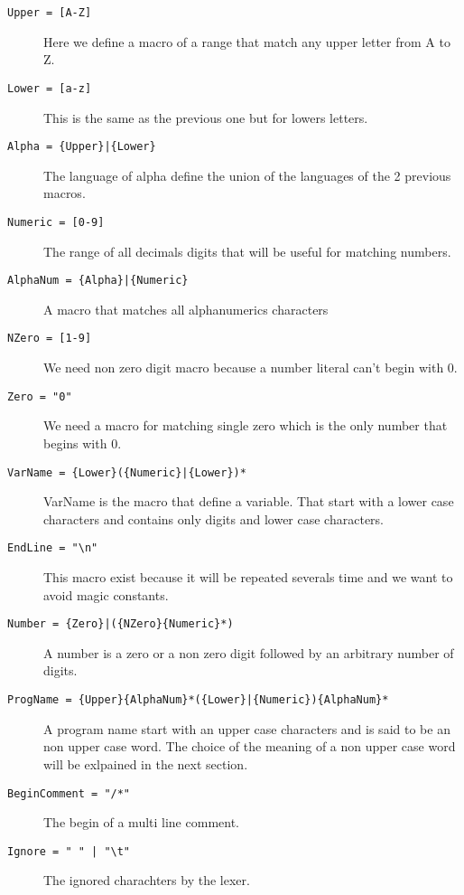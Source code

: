 \documentclass[12pt]{article}
\begin{document}
\begin{description}
    
    
    \item[\texttt{Upper = [A-Z]}]
    Here we define a macro of a range that match any upper letter from A to Z.
    
    \item[\texttt{Lower = [a-z]}]
    This is the same as the previous one but for lowers letters.
    
    \item[\texttt{Alpha          = \{Upper\}|\{Lower\}}]
    The language of alpha define the union of the languages of the 2 previous macros.
    
    \item[\texttt{Numeric        = [0-9]}]
    The range of all decimals digits that will be useful for matching numbers.
    
    \item[\texttt{AlphaNum	 = \{Alpha\}|\{Numeric\}}]
    A macro that matches all alphanumerics characters
    
    \item[\texttt{NZero          = [1-9]}]
    We need non zero digit macro because a number literal can't begin with 0.
    
    \item[\texttt{Zero           = "0"}]
    We need a macro for matching single zero which is the only number that begins with 0.
    
    \item[\texttt{VarName 	   = \{Lower\}(\{Numeric\}|\{Lower\})*}]
    VarName is the macro that define a variable. That start with a lower case characters and contains only digits and 
    lower case characters.
    
    \item[\texttt{EndLine        = "\textbackslash n"}]
    This macro exist because it will be repeated severals time and we want to avoid magic constants.
    
    \item[\texttt{Number         = \{Zero\}|(\{NZero\}\{Numeric\}*)}]
    A number is a zero or a non zero digit followed by an arbitrary number of digits.
    
    \item[\texttt{ProgName =  \{Upper\}\{AlphaNum\}*(\{Lower\}|\{Numeric\})\{AlphaNum\}*}]
    A program name start with an upper case characters and is said to be an non upper case word. 
    The choice of the meaning of a non upper case word will be exlpained in the next section.
    
    \item[\texttt{BeginComment   = "/*"}] The begin of a multi line comment.

    \item[\texttt{Ignore 		   = " " | "\textbackslash t"}] The ignored charachters by the lexer. 

\end{description}
\end{document}
